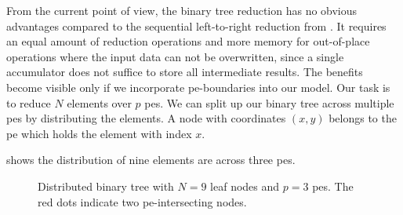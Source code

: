 From the current point of view, the binary tree reduction has no obvious advantages compared to the sequential left-to-right reduction from .
It requires an equal amount of reduction operations and more memory for out-of-place operations where the input data can not be overwritten, since a single accumulator does not suffice to store all intermediate results.
The benefits become visible only if we incorporate \gls{pe}-boundaries into our model.
Our task is to reduce $N$ elements over $p$ \glspl{pe}.
We can split up our binary tree across multiple \glspl{pe} by distributing the elements.
A node with coordinates $(x,y)$ belongs to the \gls{pe} which holds the element with index $x$.

 shows the distribution of nine elements are across three \glspl{pe}.
\begin{figure}[H]
\centering
{}
    \caption{Distributed binary tree with $N=9$ leaf nodes and $p=3$ \glspl{pe}. The red dots indicate two \gls{pe}-intersecting nodes.}
\label{fig:distributed_binary_tree}
\end{figure}

